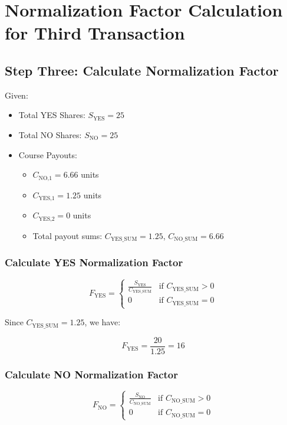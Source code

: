 \documentclass{article}
\begin{document}
\newpage

\section*{Normalization Factor Calculation for Third Transaction}

\subsection*{Step Three: Calculate Normalization Factor}

Given:
\begin{itemize}
    \item Total YES Shares: \( S_{\text{YES}} = 25 \)
    \item Total NO Shares: \( S_{\text{NO}} = 25 \)
    \item Course Payouts:
    \begin{itemize}
        \item \( C_{\text{NO,1}} = 6.66 \) units
        \item \( C_{\text{YES,1}} = 1.25 \) units
        \item \( C_{\text{YES,2}} = 0 \) units
        \item Total payout sums: \( C_{\text{YES\_SUM}} = 1.25 \), \( C_{\text{NO\_SUM}} = 6.66 \)
    \end{itemize}
\end{itemize}

\subsubsection*{Calculate YES Normalization Factor}

\[
F_{\text{YES}} =
\begin{cases}
      \frac{S_{\text{YES}}}{C_{\text{YES\_SUM}}} & \text{if } C_{\text{YES\_SUM}} > 0 \\
      0 & \text{if } C_{\text{YES\_SUM}} = 0
   \end{cases}
\]

Since \( C_{\text{YES\_SUM}} = 1.25 \), we have:

\[
F_{\text{YES}} = \frac{20}{1.25} = 16
\]

\subsubsection*{Calculate NO Normalization Factor}

\[
F_{\text{NO}} =
\begin{cases}
      \frac{S_{\text{NO}}}{C_{\text{NO\_SUM}}} & \text{if } C_{\text{NO\_SUM}} > 0 \\
      0 & \text{if } C_{\text{NO\_SUM}} = 0
   \end{cases}
\]
\end{document}
